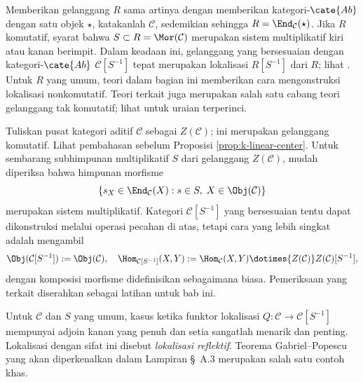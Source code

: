 \begin{contoh}
	Memberikan gelanggang $R$ sama artinya dengan memberikan
	kategori-$\cate{Ab}$ dengan satu objek $\star$, katakanlah $\mathcal{C}$,
	sedemikian sehingga $R=\End_{\mathcal{C}}(\star)$. Jika $R$ komutatif,
	syarat bahwa $S\subset R=\Mor(\mathcal{C})$ merupakan sistem
	multiplikatif kiri atau kanan berimpit. Dalam keadaan ini,
	gelanggang yang bersesuaian dengan kategori-$\cate{Ab}$
	$\mathcal{C}[S^{-1}]$ tepat merupakan lokalisasi $R[S^{-1}]$ dari $R$;
	lihat \cite[\S 5.3]{Li1}. Untuk $R$ yang umum, teori dalam bagian ini
	memberikan cara mengonstruksi lokalisasi nonkomutatif. Teori terkait juga
	merupakan salah satu cabang teori gelanggang tak komutatif; lihat
	\cite[\S 10A]{Lam99} untuk uraian terperinci.
\end{contoh}

\begin{contoh}\label{eg:central-localization}
	Tuliskan pusat kategori aditif $\mathcal{C}$ sebagai $Z(\mathcal{C})$;
	ini merupakan gelanggang komutatif. Lihat pembahasan sebelum Proposisi
	\ref{prop:k-linear-center}. Untuk sembarang subhimpunan multiplikatif $S$
	dari gelanggang $Z(\mathcal{C})$, mudah diperiksa bahwa himpunan morfisme
	\[ \{s_X \in \End_{\mathcal{C}}(X): s \in S, \; X \in \Obj(\mathcal{C}) \} \]
	merupakan sistem multiplikatif. Kategori $\mathcal{C}[S^{-1}]$ yang
	bersesuaian tentu dapat dikonstruksi melalui operasi pecahan di atas,
	tetapi cara yang lebih singkat adalah mengambil
	\[ \Obj(\mathcal{C}[S^{-1}]) := \Obj(\mathcal{C}), \quad \Hom_{\mathcal{C}[S^{-1}]}(X, Y) := \Hom_{\mathcal{C}}(X, Y) \dotimes{Z(\mathcal{C})} Z(\mathcal{C})[S^{-1}], \]
	dengan komposisi morfisme didefinisikan sebagaimana biasa. Pemeriksaan yang
	terkait diserahkan sebagai latihan untuk bab ini.
\end{contoh}

\begin{catatan}\label{rem:reflexive-localization}
	Untuk $\mathcal{C}$ dan $S$ yang umum, kasus ketika funktor lokalisasi
	$Q:\mathcal{C}\to\mathcal{C}[S^{-1}]$ mempunyai adjoin kanan yang penuh dan
	setia sangatlah menarik dan penting. Lokalisasi dengan sifat ini disebut
	\emph{lokalisasi reflektif}. Teorema Gabriel--Popescu yang akan
	diperkenalkan dalam Lampiran \S~A.3 merupakan salah satu contoh
	khas.
\end{catatan}

